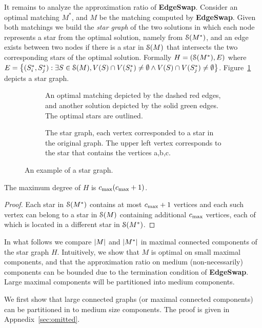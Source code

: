 It remains to analyze the approximation ratio of \textbf{EdgeSwap}.
Consider an optimal matching $M^*$, and $M$ be the matching computed
by \textbf{EdgeSwap}.  Given both matchings we build the \emph{star
graph} of the two solutions in which each node represents a star from
the optimal solution, namely from $\mathcal{S}(M^*)$, and an edge exists
between two nodes if there is a star in $\mathcal{S}(M)$ that intersects the
two corresponding stars of the optimal solution.
%
Formally $H = (\mathcal{S}(M^*), E)$ where
$
{E = \left\{ (S^*_i, S^*_j) : \exists S \in \mathcal{S}(M), 
         V(S) \cap V(S^*_i) \neq \emptyset \land
         V(S) \cap V(S^*_j) \neq \emptyset \right\}}
$.
Figure~\ref{fig:conflict} depicts a star graph.

\begin{figure}[t]
%
\begin{subfigure}[t]{.47\linewidth}
\centering
\caption{An optimal matching depicted by the dashed red edges,
and another solution depicted by the solid green edges.
The optimal stars are outlined.
}

\end{subfigure}
%
\hfill
%
\begin{subfigure}[t]{.51\linewidth}
\centering
\caption{The star graph, each vertex corresponded to a star in the
original graph.  The upper left vertex corresponds to the star that
contains the vertices a,b,c.  
}

\end{subfigure}
%
\caption{An example of a star graph.}
\label{fig:conflict}
\end{figure}  

\begin{lemma}
The maximum degree of $H$ is $c_{\max}(c_{\max}+1)$.
\end{lemma}
\begin{proof}
Each star in $\mathcal{S}(M^*)$ contains at most $c_{\max}+1$ vertices and each
such vertex can belong to a star in $\mathcal{S}(M)$ containing additional
$c_{\max}$ vertices, each of which is located in a different star in
$\mathcal{S}(M^*)$.
\end{proof}

In what follows we compare $\left| M \right|$ and $\left| M^* \right|$ in maximal
connected components of the star graph $H$.  Intuitively, we show that
$M$ is optimal on small maximal components, and that the approximation
ratio on medium (non-necessarily) components can be bounded due to the
termination condition of \textbf{EdgeSwap}.  Large maximal components
will be partitioned into medium components.

We first show that large connected graphs (or maximal connected
components) can be partitioned in to medium size components.  The
proof is given in Appnedix~\ref{sec:omitted}.

